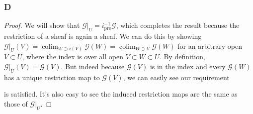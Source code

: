 \documentclass{article}
\newcommand{\id}{\mathrm{id}}
\newcommand{\fF}{\mathscr{F}}
\newcommand{\fG}{\mathscr{G}}
\DeclareMathOperator{\res}{\mathrm{res}}
\DeclareMathOperator{\pre}{\mathrm{pre}}
\DeclareMathOperator{\colim}{\mathrm{colim}}
\DeclareMathOperator{\Mor}{\mathrm{Mor}}
\begin{document}
\subsubsection{D}\label{2.7.D}
\begin{proof}
\iffalse
    Because the left-adjoint of $i_*$ is defined up to isomorphism, it suffices to show $(\vert_U, i_*)$ is an adjoint pair. Notice that for any open subset $V\subset Y$, $i^{-1}(V)=U\cap V$. On one hand, if we're given some $\phi \in \Mor(\fG\vert_U, \fF)$, we define $\tilde \phi:\fG \to i_* \fF$ be given by $\tilde \phi(V)=\phi(U\cap V)$ for any open $V\subset Y$. \fi
    We will show that $\fG\vert_U = i^{-1}_{\pre} \fG$, which completes the result because the restriction of a sheaf is again a sheaf. We can do this by showing $\fG\vert_U(V) = \colim_{W\supset i(V)} \fG(W) = \colim_{W\supset V} \fG(W)$ for an arbitrary open $V\subset U$, where the index is over all open $V\subset W\subset U$. By definition, $\fG\vert_U(V)=\fG(V)$. But indeed because $\fG(V)$ is in the index and every $\fG(W)$ has a unique restriction map to $\fG(V)$, we can easily see our requirement
    \begin{center}
    \end{center}
    is satisfied. It's also easy to see the induced restriction maps are the same as those of $\fG\vert_U$.
\end{proof}
\end{document}
